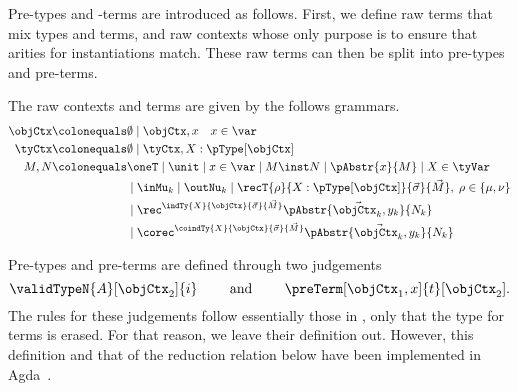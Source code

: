 \documentclass[preprint]{sigplanconf}
\begin{document}
Pre-types and -terms are introduced as follows.
First, we define raw terms that mix types and terms, and raw contexts
whose only purpose is to ensure that arities for instantiations match.
These raw terms can then be split into pre-types and pre-terms.

\begin{definition}
  The raw contexts and terms are given by the follows grammars.
  \begin{align*}
    \objCtx & \colonequals \emptyset \mid \objCtx, x \quad x \in \var \\
    \tyCtx & \colonequals \emptyset \mid \tyCtx, X : \pType[\objCtx] \\
    M, N & \colonequals
    \begin{aligned}[t]
    & \oneT \mid \unit
    \mid x \in \var
    \mid M \inst N
    \mid \pAbstr{x}{M}
    \mid X \in \tyVar \\
    & \mid \inMu_k
    \mid \outNu_k
    \mid \recT{\rho}{X : \pType[\objCtx]}{\vec{\sigma}}{
      \vec{M}}, \; \rho \in \{\mu, \nu\} \\
    &
    \mid \rec^{\indTy{X}{\objCtx}{\vec{\sigma}}{\vec{M}}}
    \vec{\pAbstr{\objCtx_k, y_k}{N_k}} \\
    &
    \mid \corec^{\coindTy{X}{\objCtx}{\vec{\sigma}}{\vec{M}}}
    \vec{\pAbstr{\objCtx_k, y_k}{N_k}}
    \end{aligned}
  \end{align*}
\end{definition}

Pre-types and pre-terms are defined through two judgements
\begin{equation*}
  \validTypeN{A}[\objCtx_2]{i}
  \qquad \text{ and } \qquad
  \preTerm[\objCtx_1, x]{t}[\objCtx_2].
\end{equation*}
The rules for these judgements follow essentially those in
, only that the type for terms is erased.
For that reason, we leave their definition out.
However, this definition and that of the reduction
relation below have been implemented in Agda~\cite{Basold:code}.
\end{document}
